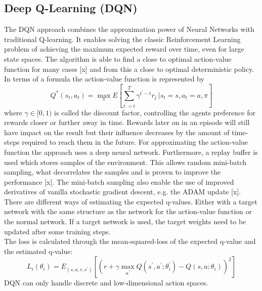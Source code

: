 \subsection{Deep Q-Learning (DQN) }
\nocite{mnih2015human}
\nocite{mnih2013playing}
\label{sec:DQN}
The DQN approach combines the approximation power of Neural Networks with traditional Q-learning.
It enables solving the classic Reinforcement Learning problem of achieving the maximum expected reward over time, even for large state spaces. The algorithm is able to find a close to optimal action-value function for many cases [x] and from this a close to optimal deterministic policy. In terms of a formula the action-value function is represented by
\[ 
Q^*(s_t,a_t)=\max_\pi E \left[
\sum_{t^{'}=t}^{T}\gamma^{t^{'}-t}r_{t^{'}}|s_t=s,
a_t=a, \pi \right] 
\]
 where $\gamma\in[0,1)$ is called the discount factor, controlling the agents preference for rewards closer or further away in time. Rewards later on in an episode will still have impact on the result but their influence decreases by the amount of time-steps required to reach them in the future.
For approximating the action-value function the approach uses a deep neural network.
Furthermore, a replay buffer is used which stores samples of the environment.
This allows random mini-batch sampling, what decorrelates the samples and is proven to improve the performance [x]. The mini-batch sampling also enable the use of improved derivatives of vanilla stochastic gradient descent, e.g. the ADAM update [x].
There are different ways of estimating the expected q-values. Either with a target network with the same 
structure as the network for the action-value function or the normal network. 
If a target network is used, the target weights need to be updated after some 
training steps.\\
The loss is calculated through the mean-squared-loss of the expected q-value 
and the estimated q-value: \[L_i(\theta_i)=E_{(s,a,r,s^{'})}
\left[\left(r+\gamma \max_{a^{'}} Q(s^{'}, 
a^{'};\theta_i^{'})-Q(s,a;\theta_i)\right)^2\right] \]
DQN can only handle discrete and low-dimensional action spaces.

